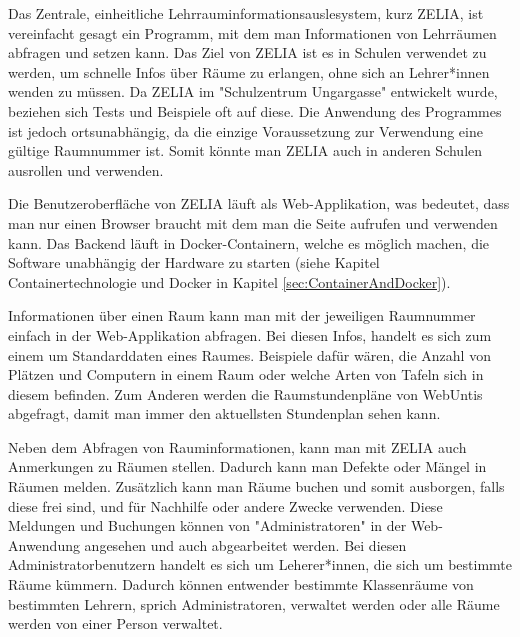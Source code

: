 

Das Zentrale, einheitliche Lehrrauminformationsauslesystem, kurz ZELIA, ist vereinfacht gesagt ein Programm, mit dem man Informationen von Lehrräumen abfragen und setzen kann. Das Ziel von ZELIA ist es in Schulen verwendet zu werden, um schnelle Infos über Räume zu erlangen, ohne sich an Lehrer*innen wenden zu müssen. Da ZELIA im "Schulzentrum Ungargasse" entwickelt wurde, beziehen sich Tests und Beispiele oft auf diese. Die Anwendung des Programmes ist jedoch ortsunabhängig, da die einzige Voraussetzung zur Verwendung eine gültige Raumnummer ist. Somit könnte man ZELIA auch in anderen Schulen ausrollen und verwenden. 

Die Benutzeroberfläche von ZELIA läuft als Web-Applikation, was bedeutet, dass man nur einen Browser braucht mit dem man die Seite aufrufen und verwenden kann. Das Backend läuft in Docker-Containern, welche es möglich machen, die Software unabhängig der Hardware zu starten (siehe Kapitel Containertechnologie und Docker in Kapitel \ref{sec:ContainerAndDocker}).

Informationen über einen Raum kann man mit der jeweiligen Raumnummer einfach in der Web-Applikation abfragen. Bei diesen Infos, handelt es sich zum einem um Standarddaten eines Raumes. Beispiele dafür wären, die Anzahl von Plätzen und Computern in einem Raum oder welche Arten von Tafeln sich in diesem befinden. Zum Anderen werden die Raumstundenpläne von WebUntis abgefragt, damit man immer den aktuellsten Stundenplan sehen kann.

Neben dem Abfragen von Rauminformationen, kann man mit ZELIA auch Anmerkungen zu Räumen stellen. Dadurch kann man Defekte oder Mängel in Räumen melden. Zusätzlich kann man Räume buchen und somit ausborgen, falls diese frei sind, und für Nachhilfe oder andere Zwecke verwenden. Diese Meldungen und Buchungen können von "Administratoren" in der Web-Anwendung angesehen und auch abgearbeitet werden. Bei diesen Administratorbenutzern handelt es sich um Leherer*innen, die sich um bestimmte Räume kümmern. Dadurch können entwender bestimmte Klassenräume von bestimmten Lehrern, sprich Administratoren, verwaltet werden oder alle Räume werden von einer Person verwaltet.

